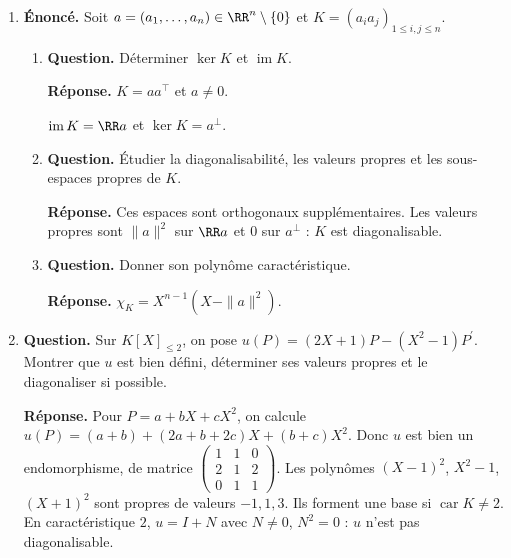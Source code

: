 \documentclass[12pt, a4paper]{article}
\begin{document}
\begin{enumerate}[label=9.\arabic*., start=94]
\begin{minipage}[t]{\linewidth}
\begin{enumerate}[\arabic*.]
  \item \textbf{Question.} Quand $f$ est-il inversible ?
\par\smallskip
\textbf{Réponse.} $f$ est inversible si et seulement si $1+c\neq0$.
        Dans ce cas, $f^{-1}=I-N/(1+c)$.

\end{enumerate}
\end{minipage}

  \item \begin{minipage}[t]{\linewidth}\raggedright
\textbf{Énoncé.} Soit $a=(a_1,\ldots,a_n)\in\RR^n\setminus\{0\}$ et $K=(a_ia_j)_{1\leq i,j\leq n}$.

\begin{enumerate}[\arabic*.]
        \item \textbf{Question.} Déterminer $\ker K$ et $\operatorname{im}K$.
\par\smallskip
\textbf{Réponse.} $K=aa^\top$ et $a\neq0$.

$\operatorname{im}K=\RR a$ et $\ker K=a^\perp$.

  \item \textbf{Question.} Étudier la diagonalisabilité, les valeurs propres et les sous-espaces propres de $K$.
\par\smallskip
\textbf{Réponse.} Ces espaces sont orthogonaux supplémentaires.
        Les valeurs propres sont $\|a\|^2$ sur $\RR a$ et $0$ sur $a^\perp$ : $K$ est diagonalisable.

  \item \textbf{Question.} Donner son polynôme caractéristique.
\par\smallskip
\textbf{Réponse.} $\chi_K=X^{n-1}(X-\|a\|^2)$.

\end{enumerate}
\end{minipage}

  \item \begin{minipage}[t]{\linewidth}\raggedright
\textbf{Question.} Sur $K[X]_{\leq2}$, on pose $u(P)=(2X+1)P-(X^2-1)P^{\prime}$. Montrer que $u$ est bien défini, déterminer ses valeurs propres et le diagonaliser si possible.
\par\smallskip
\textbf{Réponse.} Pour $P=a+bX+cX^2$, on calcule
    $u(P)=(a+b)+(2a+b+2c)X+(b+c)X^2$.
    Donc $u$ est bien un endomorphisme, de matrice
    $\begin{pmatrix}1&1&0\\2&1&2\\0&1&1\end{pmatrix}$.
    Les polynômes $(X-1)^2$, $X^2-1$, $(X+1)^2$ sont propres de valeurs $-1,1,3$.
    Ils forment une base si $\operatorname{car}K\neq2$.
    En caractéristique $2$, $u=I+N$ avec $N\neq0$, $N^2=0$ : $u$ n'est pas diagonalisable.
\end{minipage}


\end{enumerate}
\end{document}
